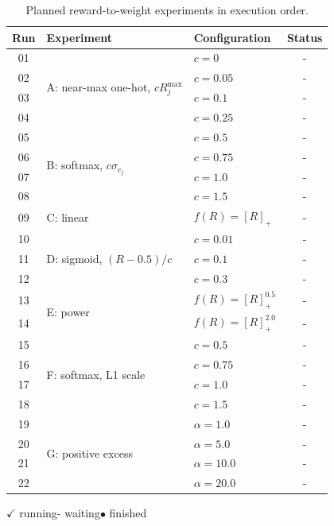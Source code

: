 \documentclass[10pt]{article} %
\begin{document}

\begin{table}[H]
    \centering
    \caption{Planned reward-to-weight experiments in execution order.}
    \label{tab:weight-variant-planned-sweep}
    \footnotesize
    \setlength{\tabcolsep}{5pt}
    \renewcommand{\arraystretch}{0.95}
    \begin{tabular}{@{}c l l c@{}}
        \toprule
        Run & Experiment & Configuration & Status \\
        \midrule
        01 & \multirow{4}{*}{A: near-max one-hot, $cR_j^{\max}$} & $c=0$  & - \\
        02 & & $c=0.05$ & - \\
        03 & & $c=0.1$ & - \\
        04 & & $c=0.25$ & - \\
        \midrule
        05 & \multirow{4}{*}{B: softmax, $c\sigma_{c_j}$} & $c=0.5$ & - \\
        06 & & $c=0.75$ & - \\
        07 & & $c=1.0$ & - \\
        08 & & $c=1.5$ & - \\
        \midrule
        09 & C: linear & $f(R)=[R]_+$ & - \\
        \midrule
        10 & \multirow{3}{*}{D: sigmoid, $(R-0.5)/c$} & $c=0.01$ & - \\
        11 & & $c=0.1$ & - \\
        12 & & $c=0.3$ & - \\
        \midrule
        13 & \multirow{2}{*}{E: power} & $f(R)=[R]_+^{0.5}$ & - \\
        14 & & $f(R)=[R]_+^{2.0}$ & - \\
        \midrule
        15 & \multirow{4}{*}{F: softmax, L1 scale} & $c=0.5$ & - \\
        16 & & $c=0.75$ & - \\
        17 & & $c=1.0$ & - \\
        18 & & $c=1.5$ & - \\
        \midrule
        19 & \multirow{4}{*}{G: positive excess} & $\alpha=1.0$ & - \\
        20 & & $\alpha=5.0$ & - \\
        21 & & $\alpha=10.0$ & - \\
        22 & & $\alpha=20.0$ & - \\
        \bottomrule
    \end{tabular}

    \vspace{0.3em}
    \scriptsize
    $\checkmark$ running\qquad - waiting\qquad $\bullet$ finished
\end{table}





\end{document}
